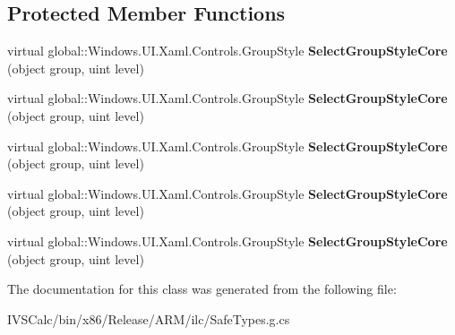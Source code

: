 \subsection*{Protected Member Functions}
\begin{DoxyCompactItemize}
\item 
\mbox{\label{class_windows_1_1_u_i_1_1_xaml_1_1_controls_1_1_group_style_selector_a734429e0eae3924f77e744b5cbd72906}} 
virtual global\+::\+Windows.\+U\+I.\+Xaml.\+Controls.\+Group\+Style {\bfseries Select\+Group\+Style\+Core} (object group, uint level)
\item 
\mbox{\label{class_windows_1_1_u_i_1_1_xaml_1_1_controls_1_1_group_style_selector_a734429e0eae3924f77e744b5cbd72906}} 
virtual global\+::\+Windows.\+U\+I.\+Xaml.\+Controls.\+Group\+Style {\bfseries Select\+Group\+Style\+Core} (object group, uint level)
\item 
\mbox{\label{class_windows_1_1_u_i_1_1_xaml_1_1_controls_1_1_group_style_selector_a734429e0eae3924f77e744b5cbd72906}} 
virtual global\+::\+Windows.\+U\+I.\+Xaml.\+Controls.\+Group\+Style {\bfseries Select\+Group\+Style\+Core} (object group, uint level)
\item 
\mbox{\label{class_windows_1_1_u_i_1_1_xaml_1_1_controls_1_1_group_style_selector_a734429e0eae3924f77e744b5cbd72906}} 
virtual global\+::\+Windows.\+U\+I.\+Xaml.\+Controls.\+Group\+Style {\bfseries Select\+Group\+Style\+Core} (object group, uint level)
\item 
\mbox{\label{class_windows_1_1_u_i_1_1_xaml_1_1_controls_1_1_group_style_selector_a734429e0eae3924f77e744b5cbd72906}} 
virtual global\+::\+Windows.\+U\+I.\+Xaml.\+Controls.\+Group\+Style {\bfseries Select\+Group\+Style\+Core} (object group, uint level)
\end{DoxyCompactItemize}


The documentation for this class was generated from the following file\+:\begin{DoxyCompactItemize}
\item 
I\+V\+S\+Calc/bin/x86/\+Release/\+A\+R\+M/ilc/Safe\+Types.\+g.\+cs\end{DoxyCompactItemize}
